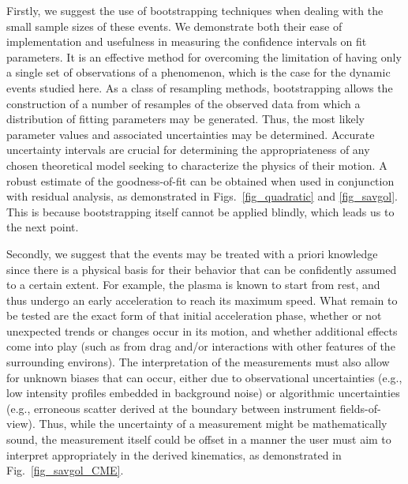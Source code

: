 \documentclass[referee]{aa}
\begin{document}
Firstly, we suggest the use of bootstrapping techniques when dealing with the small sample sizes of these events. We demonstrate both their ease of implementation and usefulness in measuring the confidence intervals on fit parameters. It is an effective method for overcoming the limitation of having only a single set of observations of a phenomenon, which is the case for the dynamic events studied here. As a class of resampling methods, bootstrapping allows the construction of a number of resamples of the observed data from which a distribution of fitting parameters may be generated. Thus, the most likely parameter values and associated uncertainties may be determined. Accurate uncertainty intervals are crucial for determining the appropriateness of any chosen theoretical model seeking to characterize the physics of their motion. A robust estimate of the goodness-of-fit can be obtained when used in conjunction with residual analysis, as demonstrated in Figs.~\ref{fig_quadratic} and \ref{fig_savgol}. This is because bootstrapping itself cannot be applied blindly, which leads us to the next point.

Secondly, we suggest that the events may be treated with a priori knowledge since there is a physical basis for their behavior that can be confidently assumed to a certain extent. For example, the plasma is known to start from rest, and thus undergo an early acceleration to reach its maximum speed. What remain to be tested are the exact form of that initial acceleration phase, whether or not unexpected trends or changes occur in its motion, and whether additional effects come into play (such as from drag and/or interactions with other features of the surrounding environs). The interpretation of the measurements must also allow for unknown biases that can occur, either due to observational uncertainties (e.g., low intensity profiles embedded in background noise) or algorithmic uncertainties (e.g., erroneous scatter derived at the boundary between instrument fields-of-view). Thus, while the uncertainty of a measurement might be mathematically sound, the measurement itself could be offset in a manner the user must aim to interpret appropriately in the derived kinematics, as demonstrated in Fig.~\ref{fig_savgol_CME}.
\end{document}
